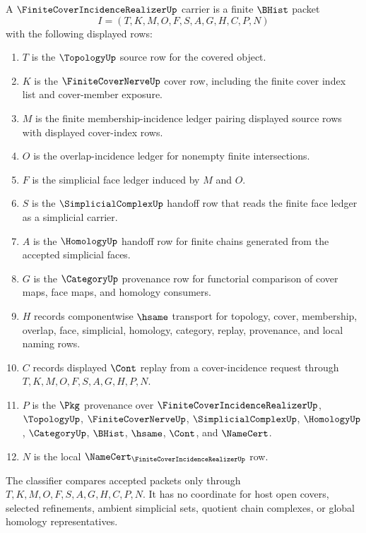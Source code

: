 \begin{definition}
\label{def:finite-cover-incidence-realizer-carrier}
A $\FiniteCoverIncidenceRealizerUp$ carrier is a finite $\BHist$ packet
$$
I=(T,K,M,O,F,S,A,G,H,C,P,N)
$$
with the following displayed rows:
\begin{enumerate}
\item $T$ is the $\TopologyUp$ source row for the covered object.
\item $K$ is the $\FiniteCoverNerveUp$ cover row, including the finite cover index list and cover-member exposure.
\item $M$ is the finite membership-incidence ledger pairing displayed source rows with displayed cover-index rows.
\item $O$ is the overlap-incidence ledger for nonempty finite intersections.
\item $F$ is the simplicial face ledger induced by $M$ and $O$.
\item $S$ is the $\SimplicialComplexUp$ handoff row that reads the finite face ledger as a simplicial carrier.
\item $A$ is the $\HomologyUp$ handoff row for finite chains generated from the accepted simplicial faces.
\item $G$ is the $\CategoryUp$ provenance row for functorial comparison of cover maps, face maps, and homology consumers.
\item $H$ records componentwise $\hsame$ transport for topology, cover, membership, overlap, face, simplicial, homology, category, replay, provenance, and local naming rows.
\item $C$ records displayed $\Cont$ replay from a cover-incidence request through $T,K,M,O,F,S,A,G,H,P,N$.
\item $P$ is the $\Pkg$ provenance over $\FiniteCoverIncidenceRealizerUp$, $\TopologyUp$, $\FiniteCoverNerveUp$, $\SimplicialComplexUp$, $\HomologyUp$, $\CategoryUp$, $\BHist$, $\hsame$, $\Cont$, and $\NameCert$.
\item $N$ is the local $\NameCert_{\FiniteCoverIncidenceRealizerUp}$ row.
\end{enumerate}
The classifier compares accepted packets only through $T,K,M,O,F,S,A,G,H,C,P,N$. It has no coordinate for host open covers, selected refinements, ambient simplicial sets, quotient chain complexes, or global homology representatives.
\end{definition}

